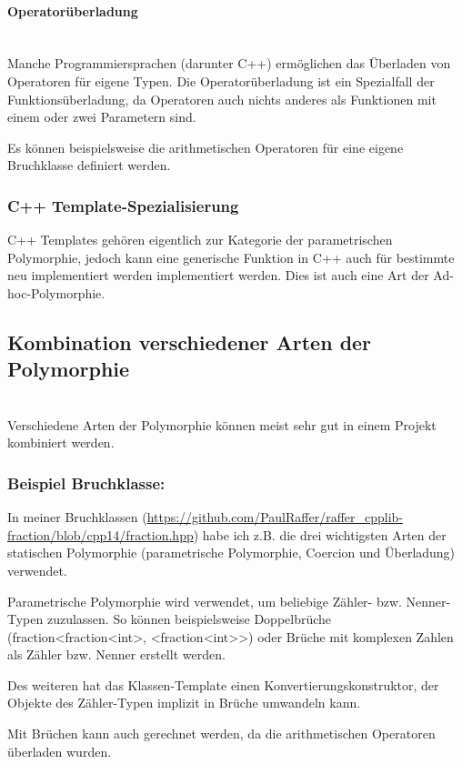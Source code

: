 			\paragraph{Operatorüberladung}\mbox{}\\
				Manche Programmiersprachen (darunter C++) ermöglichen das Überladen von Operatoren für eigene Typen. Die
				Operatorüberladung ist ein Spezialfall der Funktionsüberladung, da Operatoren auch nichts anderes als
				Funktionen mit einem oder zwei Parametern sind.
				
				Es können beispielsweise die arithmetischen Operatoren für eine eigene Bruchklasse definiert werden.
				
		\subsubsection{C++ Template-Spezialisierung}
			C++ Templates gehören eigentlich zur Kategorie der parametrischen Polymorphie, jedoch kann eine generische Funktion in C++ auch für
			bestimmte neu implementiert werden implementiert werden. Dies ist auch eine Art der Ad-hoc-Polymorphie.
			
	\subsection{Kombination verschiedener Arten der Polymorphie}\mbox{}\\
		Verschiedene Arten der Polymorphie können meist sehr gut in einem Projekt kombiniert werden.
		\subsubsection*{Beispiel Bruchklasse:}
			In meiner Bruchklassen (\url{https://github.com/PaulRaffer/raffer_cpplib-fraction/blob/cpp14/fraction.hpp}) habe ich z.B. die
			drei wichtigsten Arten der statischen Polymorphie (parametrische Polymorphie, Coercion und Überladung) verwendet.
			
			Parametrische Polymorphie wird verwendet, um beliebige Zähler- bzw. Nenner-Typen zuzulassen. So können beispielsweise
			Doppelbrüche (fraction<fraction<int>, <fraction<int>>) oder Brüche mit komplexen Zahlen als Zähler bzw. Nenner erstellt
			werden.
			
			Des weiteren hat das Klassen-Template einen Konvertierungskonstruktor, der Objekte des Zähler-Typen implizit in Brüche
			umwandeln kann.
			
			Mit Brüchen kann auch gerechnet werden, da die arithmetischen Operatoren überladen wurden.